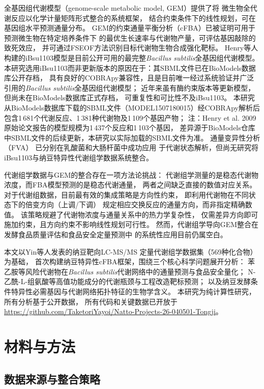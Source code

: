 \documentclass[10pt, a4paper, twocolumn]{ctexart}
\newcommand{\ibsu}{iBsu1103}
\newcommand{\bs}{\textit{Bacillus subtilis}}
\newcommand{\cfba}{cFBA}
\newcommand{\NAH}{N-乙酰-L-组氨酸}
\begin{document}
全基因组代谢模型（genome-scale metabolic model, GEM）提供了将
微生物全代谢反应以化学计量矩阵形式整合的系统框架，
结合约束条件下的线性规划，可在基因组水平预测通量分布\citep{Orth2010}。
GEM的约束通量平衡分析（cFBA）已被证明可用于预测微生物在特定培养条件下
的最优生长速率与代谢物产量，可评估基因敲除的致死效应\citep{Burgard2003}，
并可通过FSEOF方法识别目标代谢物生物合成强化靶标\citep{Patil2005}。
Henry等人构建的\ibsu{}模型是目前公开可用的最完整\bs{}全基因组代谢模型\citep{Henry2009}。
本研究选用\ibsu{}而非更新版本的原因在于：其SBML文件已在BioModels数据库公开存档，
具有良好的COBRApy兼容性，且是目前唯一经过系统验证并广泛引用的\bs{}全基因组代谢模型；
近年来虽有酶约束版本等更新模型，但尚未在BioModels数据库正式存档，
可重复性和可比性不及\ibsu{}。
本研究从BioModels数据库下载的SBML文件（MODEL1507180015）经COBRApy解析后
包含1\,681个代谢反应、1\,381种代谢物及1\,109个基因产物；
注：Henry et al. 2009原始论文报告的模型规模为1\,437个反应和1\,103个基因，
差异源于BioModels仓库中SBML文件的后续更新，本研究以实际加载的SBML文件为准。
通量变异性分析（FVA）\citep{Gudmundsson2010}
已分别在乳酸菌\citep{Teusink2006}和大肠杆菌\citep{Feist2007}中成功应用
于代谢状态解析，但尚无研究将\ibsu{}与纳豆特异性代谢组学数据系统整合。

代谢组学数据与GEM的整合存在一项方法论挑战：
代谢组学测量的是稳态代谢物浓度，而FBA模型预测的是稳态代谢通量，
两者之间缺乏直接的数值对应关系。
对于代谢组数据，目前最有效的集成策略是方向性约束，
即利用代谢物在不同状态下的倍变方向（上调/下调）
规定相应交换反应的通量方向，而非指定精确数值\citep{Mahadevan2003}。
该策略规避了代谢物浓度与通量关系中的热力学复杂性，
仅需差异方向即可施加约束，且方向约束不影响线性规划可行性。
然而，代谢组学导向GEM整合在发酵食品质量评估和食品安全定量预测中
的系统性应用目前仍属空白。

本文以Yin等人\citep{Yin2024}发表的纳豆靶向LC-MS/MS
定量代谢组学数据集（569种化合物）为基础，
首次构建纳豆特异性\cfba{}框架，围绕三个核心科学问题展开分析：
苯乙胺等风险代谢物在\bs{}代谢网络中的通量预测与食品安全量化；
\NAH{}等高值功能成分的代谢瓶颈与工程改造靶标预测；
以及纳豆发酵条件特异性必需基因与代谢网络拓扑特征的生物学含义。
本研究为纯计算性研究，所有分析基于公开数据，
所有代码和关键数据已开放于
\url{https://github.com/TaketoriYayoi/Natto-Projects-26-040501-Tongji}。

\section{材料与方法}

\subsection{数据来源与整合策略}
\end{document}

